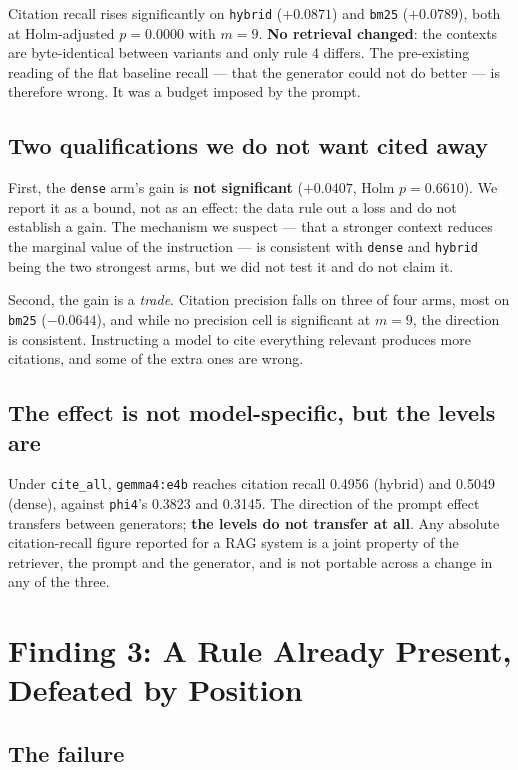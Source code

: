 \documentclass[conference]{IEEEtran}
\begin{document}
Citation recall rises significantly on \texttt{hybrid} ($+0.0871$) and
\texttt{bm25} ($+0.0789$), both at Holm-adjusted $p=0.0000$ with $m=9$.
\textbf{No retrieval changed}: the contexts are byte-identical between variants
and only rule 4 differs. The pre-existing reading of the flat baseline recall ---
that the generator could not do better --- is therefore wrong. It was a budget
imposed by the prompt.

\subsection{Two qualifications we do not want cited away}

First, the \texttt{dense} arm's gain is \textbf{not significant} ($+0.0407$, Holm
$p=0.6610$). We report it as a bound, not as an effect: the data rule out a loss
and do not establish a gain. The mechanism we suspect --- that a stronger context
reduces the marginal value of the instruction --- is consistent with
\texttt{dense} and \texttt{hybrid} being the two strongest arms, but we did not
test it and do not claim it.

Second, the gain is a \emph{trade}. Citation precision falls on three of four
arms, most on \texttt{bm25} ($-0.0644$), and while no precision cell is
significant at $m=9$, the direction is consistent. Instructing a model to cite
everything relevant produces more citations, and some of the extra ones are
wrong.

\subsection{The effect is not model-specific, but the levels are}

Under \texttt{cite\_all}, \texttt{gemma4:e4b} reaches citation recall 0.4956
(hybrid) and 0.5049 (dense), against \texttt{phi4}'s 0.3823 and 0.3145. The
direction of the prompt effect transfers between generators; \textbf{the levels
do not transfer at all}. Any absolute citation-recall figure reported for a RAG
system is a joint property of the retriever, the prompt and the generator, and is
not portable across a change in any of the three.

\section{Finding 3: A Rule Already Present, Defeated by Position}

\subsection{The failure}
\end{document}
